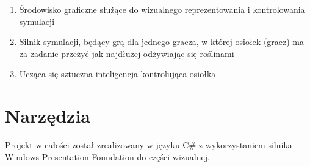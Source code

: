 \begin{enumerate}
    \item Środowisko graficzne służące do wizualnego reprezentowania i kontrolowania symulacji
    \item Silnik symulacji, będący grą dla jednego gracza, w której osiołek (gracz) ma za zadanie przeżyć jak najdłużej odżywiając się roślinami
    \item Ucząca się sztuczna inteligencja kontrolująca osiołka
\end{enumerate}

\section{Narzędzia}
Projekt w całości został zrealizowany w języku C\# z wykorzystaniem silnika Windows Presentation Foundation do części wizualnej.


